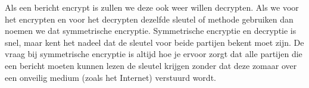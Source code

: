 Als een bericht encrypt is zullen we deze ook weer willen decrypten. Als we voor het encrypten en voor het decrypten dezelfde sleutel of methode gebruiken dan noemen we dat symmetrische encryptie. Symmetrische encryptie en decryptie is snel, maar kent het nadeel dat de sleutel voor beide partijen bekent moet zijn. De vraag bij symmetrische encryptie is altijd hoe je ervoor zorgt dat alle partijen die een bericht moeten kunnen lezen de sleutel krijgen zonder dat deze zomaar over een onveilig medium (zoals het Internet) verstuurd wordt.

